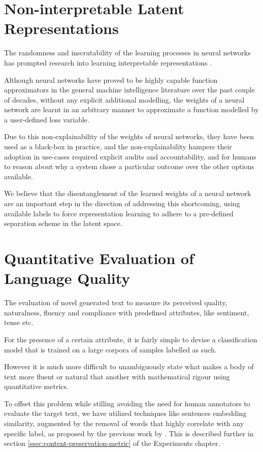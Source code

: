 \section{Non-interpretable Latent Representations}

The randomness and inscrutability of the learning processes in neural networks has prompted research into learning interpretable representations \citep{chen2016infogan}.

Although neural networks have proved to be highly capable function approximators in the general machine intelligence literature over the past couple of decades, without any explicit additional modelling, the weights of a neural network are learnt in an arbitrary manner to approximate a function modelled by a user-defined loss variable.

Due to this non-explainability of the weights of neural networks, they have been used as a black-box in practice, and the non-explainability hampers their adoption in use-cases required explicit audits and accountability, and for humans to reason about why a system chose a particular outcome over the other options available.

We believe that the disentanglement of the learned weights of a neural network are an important step in the direction of addressing this shortcoming, using available labels to force representation learning to adhere to a pre-defined separation scheme in the latent space.


\section{Quantitative Evaluation of Language Quality}

The evaluation of novel generated text to measure its perceived quality, naturalness, fluency and compliance with predefined attributes, like sentiment, tense etc.

For the presence of a certain attribute, it is fairly simple to devise a classification model that is trained on a large corpora of samples labelled as such.

However it is much more difficult to unambiguously state what makes a body of text more fluent or natural that another with mathematical rigour using quantitative metrics.

To offset this problem while stilling avoiding the need for human annotators to evaluate the target text, we have utilized techniques like sentences embedding similarity, augmented by the removal of words that highly correlate with any specific label, as proposed by the previous work by \cite{fu2017style}. This is described further in section \ref{ssec:content-preservation-metric} of the Experiments chapter.
